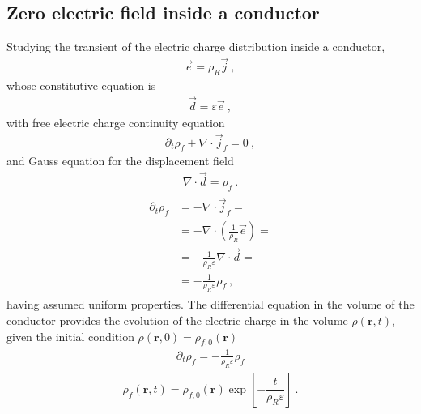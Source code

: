 \documentclass[letterpaper,10pt,english]{jupyterBook}
\begin{document}
\subsection{Zero electric field inside a conductor}
\label{\detokenize{ch/regimes-electrostatics:zero-electric-field-inside-a-conductor}}
\sphinxAtStartPar
Studying the transient of the electric charge distribution inside a conductor,
\begin{equation*}
\begin{split}\vec{e} = \rho_R \vec{j} \ ,\end{split}
\end{equation*}
\sphinxAtStartPar
whose constitutive equation is
\begin{equation*}
\begin{split}\vec{d} = \varepsilon \vec{e} \ ,\end{split}
\end{equation*}
\sphinxAtStartPar
with free electric charge continuity equation
\begin{equation*}
\begin{split}\partial_t \rho_f + \nabla \cdot \vec{j}_f = 0 \ ,\end{split}
\end{equation*}
\sphinxAtStartPar
and Gauss equation for the displacement field
\begin{equation*}
\begin{split}\nabla \cdot \vec{d} = \rho_f \ .\end{split}
\end{equation*}\begin{equation*}
\begin{split}\begin{aligned}
  \partial_t \rho_f
  & = - \nabla \cdot \vec{j}_f = \\
  & = - \nabla \cdot \left( \frac{1}{\rho_R} \vec{e} \right) = \\
  & = - \frac{1}{\rho_R \varepsilon} \nabla \cdot \vec{d} = \\
  & = - \frac{1}{\rho_R \varepsilon} \rho_f \ ,
\end{aligned}\end{split}
\end{equation*}
\sphinxAtStartPar
having assumed uniform properties. The differential equation in the volume of the conductor provides the evolution of the electric charge in the volume \(\rho(\mathbf{r},t)\), given the initial condition \(\rho(\mathbf{r},0) = \rho_{f,0}(\mathbf{r})\)
\begin{equation*}
\begin{split}\partial_t \rho_f = - \frac{1}{\rho_R \varepsilon} \rho_f\end{split}
\end{equation*}\begin{equation*}
\begin{split}\rho_f(\mathbf{r},t) = \rho_{f,0}(\mathbf{r}) \exp\left[ - \dfrac{t}{\rho_R \varepsilon} \right] \ .\end{split}
\end{equation*}
\end{document}
